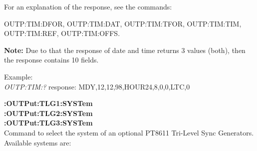For an explanation of the response, see the commands: 

OUTP:TIM:DFOR, OUTP:TIM:DAT, OUTP:TIM:TFOR, OUTP:TIM:TIM, OUTP:TIM:REF, OUTP:TIM:OFFS.

\textbf{Note:} Due to that the response of date and time returns 3 values (both), then the response contains 10 fields.

Example:\\
\textit{OUTP:TIM:?}
response: MDY,12,12,98,HOUR24,8,0,0,LTC,0







\textbf{:OUTPut:TLG1:SYSTem}\\
\textbf{:OUTPut:TLG2:SYSTem}\\
\textbf{:OUTPut:TLG3:SYSTem}\\
Command to select the system of an optional PT8611 Tri-Level Sync Generators. Available systems are:

